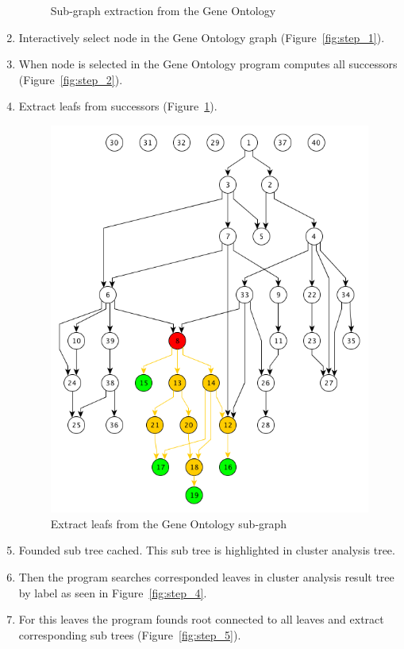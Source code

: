 \begin{enumerate}
\begin{figure}[h!]
{}
\caption{Sub-graph extraction from the Gene Ontology}
\end{figure}

\item Interactively select node in the Gene Ontology graph (Figure~\ref{fig:step_1}).

\item When node is selected in the Gene Ontology program computes all successors (Figure~\ref{fig:step_2}).

\item Extract leafs from successors (Figure~\ref{fig:step_3}).

\begin{figure}[h!]
\centering
\includegraphics[scale=0.5]{pictures/subgraph_extraction_algorithm_step_3.png}
\caption{Extract leafs from the Gene Ontology sub-graph}
\label{fig:step_3}
\end{figure}

\item Founded sub tree cached. This sub tree is highlighted in cluster analysis tree.

\item Then the program searches corresponded leaves in cluster analysis result tree by label as seen in Figure~\ref{fig:step_4}.

\item For this leaves the program founds root connected to all leaves and extract corresponding sub trees (Figure~\ref{fig:step_5}).
\end{enumerate}


